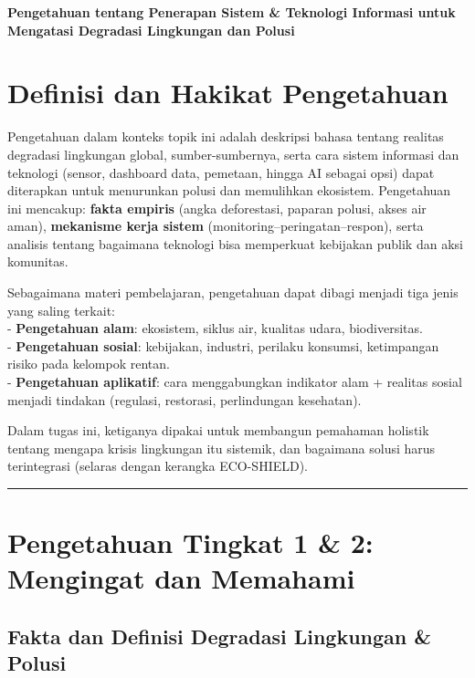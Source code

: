 \documentclass[
  letterpaper,
  DIV=11,
  numbers=noendperiod]{scrreprt}
\begin{document}
\textbf{Pengetahuan tentang Penerapan Sistem \& Teknologi Informasi
untuk Mengatasi Degradasi Lingkungan dan Polusi}

\section{Definisi dan Hakikat
Pengetahuan}\label{definisi-dan-hakikat-pengetahuan}

Pengetahuan dalam konteks topik ini adalah deskripsi bahasa tentang
realitas degradasi lingkungan global, sumber-sumbernya, serta cara
sistem informasi dan teknologi (sensor, dashboard data, pemetaan, hingga
AI sebagai opsi) dapat diterapkan untuk menurunkan polusi dan memulihkan
ekosistem. Pengetahuan ini mencakup: \textbf{fakta empiris} (angka
deforestasi, paparan polusi, akses air aman), \textbf{mekanisme kerja
sistem} (monitoring--peringatan--respon), serta analisis tentang
bagaimana teknologi bisa memperkuat kebijakan publik dan aksi komunitas.

Sebagaimana materi pembelajaran, pengetahuan dapat dibagi menjadi tiga
jenis yang saling terkait:\\
- \textbf{Pengetahuan alam}: ekosistem, siklus air, kualitas udara,
biodiversitas.\\
- \textbf{Pengetahuan sosial}: kebijakan, industri, perilaku konsumsi,
ketimpangan risiko pada kelompok rentan.\\
- \textbf{Pengetahuan aplikatif}: cara menggabungkan indikator alam +
realitas sosial menjadi tindakan (regulasi, restorasi, perlindungan
kesehatan).

Dalam tugas ini, ketiganya dipakai untuk membangun pemahaman holistik
tentang mengapa krisis lingkungan itu sistemik, dan bagaimana solusi
harus terintegrasi (selaras dengan kerangka ECO-SHIELD).

\begin{center}\rule{0.5\linewidth}{0.5pt}\end{center}

\section{Pengetahuan Tingkat 1 \& 2: Mengingat dan
Memahami}\label{pengetahuan-tingkat-1-2-mengingat-dan-memahami}

\subsection{Fakta dan Definisi Degradasi Lingkungan \&
Polusi}\label{fakta-dan-definisi-degradasi-lingkungan-polusi}
\end{document}
